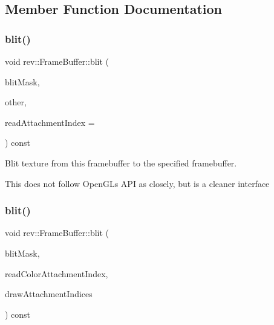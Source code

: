 \subsection{Member Function Documentation}
\mbox{\label{classrev_1_1_frame_buffer_a6853bb65a669c0e263c359a01a32d678}} 
\subsubsection{\texorpdfstring{blit()}{blit()}\hspace{0.1cm}{\footnotesize\ttfamily [1/2]}}
{\footnotesize\ttfamily void rev\+::\+Frame\+Buffer\+::blit (\begin{DoxyParamCaption}\item[{Blit\+Mask}]{blit\+Mask,  }\item[{\mbox{\hyperlink{classrev_1_1_frame_buffer}{Frame\+Buffer}} \&}]{other,  }\item[{uint32\+\_\+t}]{read\+Attachment\+Index = {} }\end{DoxyParamCaption}) const}



Blit texture from this framebuffer to the specified framebuffer. 

This does not follow Open\+GL\textquotesingle{}s A\+PI as closely, but is a cleaner interface \mbox{\label{classrev_1_1_frame_buffer_a03d7ca6784c7b4d277c47c29f81f631a}} 
\subsubsection{\texorpdfstring{blit()}{blit()}\hspace{0.1cm}{\footnotesize\ttfamily [2/2]}}
{\footnotesize\ttfamily void rev\+::\+Frame\+Buffer\+::blit (\begin{DoxyParamCaption}\item[{Blit\+Mask}]{blit\+Mask,  }\item[{uint32\+\_\+t}]{read\+Color\+Attachment\+Index,  }\item[{const std\+::vector$<$ uint32\+\_\+t $>$ \&}]{draw\+Attachment\+Indices }\end{DoxyParamCaption}) const\hspace{0.3cm}{\ttfamily [protected]}}



